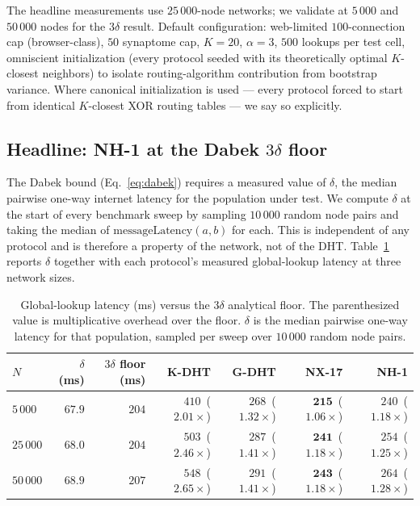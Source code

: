 \documentclass[conference]{IEEEtran}
\newcommand{\nhone}{NH-1\xspace}
\newcommand{\NXseventeen}{NX-17\xspace}
\begin{document}
The headline measurements use $25\,000$-node networks; we validate at
$5\,000$ and $50\,000$ nodes for the $3\delta$ result. Default
configuration: web-limited $100$-connection cap (browser-class), $50$
synaptome cap, $K=20$, $\alpha = 3$, $500$ lookups per test cell,
omniscient initialization (every protocol seeded with its theoretically
optimal $K$-closest neighbors) to isolate routing-algorithm contribution
from bootstrap variance. Where canonical initialization is used --- every
protocol forced to start from identical $K$-closest XOR routing tables
--- we say so explicitly.

\subsection{Headline: \nhone at the Dabek $3\delta$ floor}
\label{sec:eval-floor}

The Dabek bound (Eq.~\ref{eq:dabek}) requires a measured value of
$\delta$, the median pairwise one-way internet latency for the
population under test. We compute $\delta$ at the start of every
benchmark sweep by sampling $10\,000$ random node pairs and taking the
median of $\mathrm{messageLatency}(a, b)$ for each. This is independent
of any protocol and is therefore a property of the network, not of the
DHT. Table~\ref{tab:floor} reports $\delta$ together with each
protocol's measured global-lookup latency at three network sizes.

\begin{table}[t]
\centering
\caption{Global-lookup latency (ms) versus the $3\delta$ analytical floor.
The parenthesized value is multiplicative overhead over the floor.
$\delta$ is the median pairwise one-way latency for that population, sampled per sweep over $10\,000$ random node pairs.}
\label{tab:floor}
\small
\begin{tabular}{@{}lrrrrrr@{}}
\toprule
$N$ & $\delta$ (ms) & $3\delta$ floor (ms) & K-DHT & G-DHT & \NXseventeen & \nhone \\
\midrule
$5\,000$  & $67.9$ & $204$ & $410$\ ($2.01\times$) & $268$\ ($1.32\times$) & $\mathbf{215}$\ ($\mathbf{1.06\times}$) & $240$\ ($1.18\times$) \\
$25\,000$ & $68.0$ & $204$ & $503$\ ($2.46\times$) & $287$\ ($1.41\times$) & $\mathbf{241}$\ ($\mathbf{1.18\times}$) & $254$\ ($1.25\times$) \\
$50\,000$ & $68.9$ & $207$ & $548$\ ($2.65\times$) & $291$\ ($1.41\times$) & $\mathbf{243}$\ ($\mathbf{1.18\times}$) & $264$\ ($1.28\times$) \\
\bottomrule
\end{tabular}
\end{table}
\end{document}
